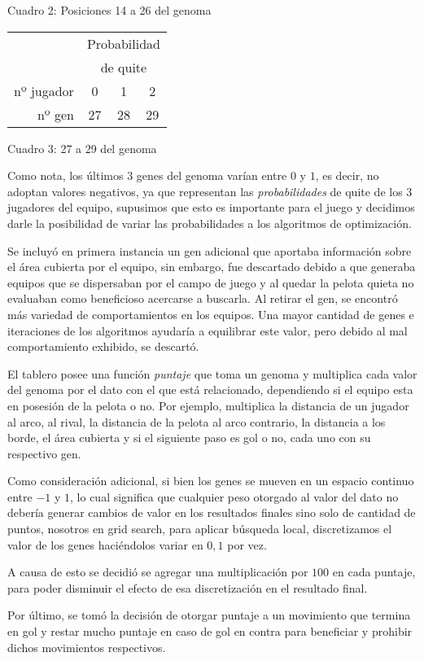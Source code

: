 \vskip 1mm
\begin{center}
{Cuadro 2: Posiciones 14 a 26 del genoma}
\end{center}

\begin{tabular}{r|ccc|}
\cline{2-4}
 & \multicolumn{3}{c|}{Probabilidad} \\
 & \multicolumn{3}{c|}{de quite} \\ \hline
\multicolumn{1}{|r|}{nº jugador} & 0 & 1 & 2 \\ \hline
\multicolumn{1}{|r|}{nº gen} & 27 & 28 & 29 \\ \hline
\end{tabular}

\vskip 1mm
\begin{center}
{Cuadro 3: 27 a 29 del genoma}
\end{center}

Como nota, los últimos 3 genes del genoma varían entre $0$ y $1$, es decir, no
adoptan valores negativos, ya que representan las {\it probabilidades\/} de
quite de los 3 jugadores del equipo, supusimos que esto es importante para el
juego y decidimos darle la posibilidad de variar las probabilidades a los
algoritmos de optimización.

Se incluyó en primera instancia un gen adicional que aportaba información sobre
el área cubierta por el equipo, sin embargo,  fue descartado debido a que
generaba equipos que se dispersaban por el campo de juego y al quedar la pelota
quieta no evaluaban como beneficioso acercarse a buscarla. Al retirar el gen,
se encontró más variedad de comportamientos en los equipos. Una mayor cantidad de
genes e iteraciones de los algoritmos ayudaría a equilibrar este valor, pero
debido al mal comportamiento exhibido, se descartó.

El tablero posee una función {\it puntaje\/} que toma un genoma y
multiplica cada valor del genoma por el dato con el que está relacionado,
dependiendo si el equipo esta en posesión de la pelota o no. Por ejemplo,
multiplica la distancia de un jugador al arco, al rival, la distancia de la
pelota al arco contrario, la distancia a los borde, el área cubierta y si el
siguiente paso es gol o no, cada uno con su respectivo gen.



Como consideración adicional, si bien los genes se mueven en un espacio continuo entre $-1$ y $1$,
lo cual significa que cualquier peso otorgado al valor del dato no debería generar
cambios de valor en los resultados finales sino solo de cantidad de puntos,
nosotros en grid search, para aplicar búsqueda local, discretizamos el valor de los
genes haciéndolos variar en $0,1$ por vez.


A causa de esto se decidió se agregar una multiplicación por $100$ en cada
puntaje, para poder disminuir el efecto de esa discretización en el resultado final.


Por último, se tomó la decisión de otorgar puntaje a un movimiento que termina
en gol y restar mucho puntaje en caso de gol en contra para beneficiar y
prohibir dichos movimientos respectivos.
